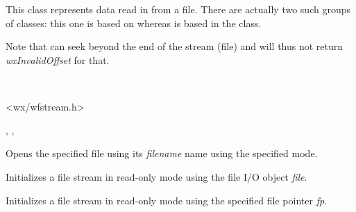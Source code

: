 \section{}\label{wxffileinputstream}

This class represents data read in from a file. There are actually
two such groups of classes: this one is based on  
whereas  is based in
the  class.

Note that  
can seek beyond the end of the stream (file) and will thus not return 
{\it wxInvalidOffset} for that.


\\


<wx/wfstream.h>




, , 


\label{wxffileinputstreamctor}


Opens the specified file using its {\it filename} name using the specified mode.


Initializes a file stream in read-only mode using the file I/O object {\it file}.


Initializes a file stream in read-only mode using the specified file pointer {\it fp}.


